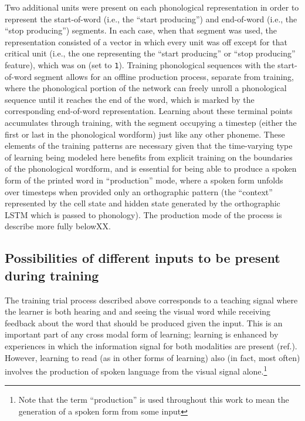 \documentclass[
  american,
  man,floatsintext]{apa6}
\begin{document}
Two additional units were present on each phonological representation in order to represent the start-of-word (i.e., the ``start producing'') and end-of-word (i.e., the ``stop producing'') segments. In each case, when that segment was used, the representation consisted of a vector in which every unit was off except for that critical unit (i.e., the one representing the ``start producing'' or ``stop producing'' feature), which was on (set to \texttt{1}). Training phonological sequences with the start-of-word segment allows for an offline production process, separate from training, where the phonological portion of the network can freely unroll a phonological sequence until it reaches the end of the word, which is marked by the corresponding end-of-word representation. Learning about these terminal points accumulates through training, with the segment occupying a timestep (either the first or last in the phonological wordform) just like any other phoneme. These elements of the training patterns are necessary given that the time-varying type of learning being modeled here benefits from explicit training on the boundaries of the phonological wordform, and is essential for being able to produce a spoken form of the printed word in ``production'' mode, where a spoken form unfolds over timesteps when provided only an orthographic pattern (the ``context'' represented by the cell state and hidden state generated by the orthographic LSTM which is passed to phonology). The production mode of the process is describe more fully belowXX.

\hypertarget{possibilities-of-different-inputs-to-be-present-during-training}{%
\subsection{Possibilities of different inputs to be present during training}\label{possibilities-of-different-inputs-to-be-present-during-training}}

The training trial process described above corresponds to a teaching signal where the learner is both hearing and and seeing the visual word while receiving feedback about the word that should be produced given the input. This is an important part of any cross modal form of learning; learning is enhanced by experiences in which the information signal for both modalities are present (ref.). However, learning to read (as in other forms of learning) also (in fact, most often) involves the production of spoken language from the visual signal alone.\footnote{Note that the term ``production'' is used throughout this work to mean the generation of a spoken form from some input}
\end{document}
